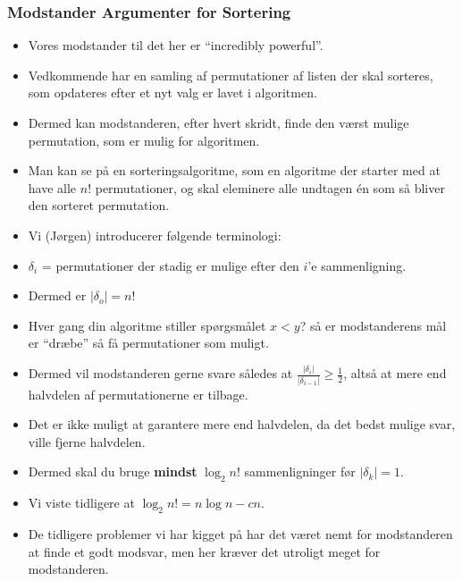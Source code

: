 \begin{frame}[allowframebreaks]
  \frametitle{Modstander Argumenter for Sortering}
\begin{itemize}
  \item Vores modstander til det her er ``incredibly powerful''.
  \item Vedkommende har en samling af permutationer af listen der skal sorteres, som opdateres efter et nyt valg er lavet i algoritmen.
  \item Dermed kan modstanderen, efter hvert skridt, finde den værst mulige permutation, som er mulig for algoritmen.
  \item Man kan se på en sorteringsalgoritme, som en algoritme der starter med at have alle $n!$ permutationer, og skal eleminere alle undtagen én som så bliver den sorteret permutation.
  \item Vi (Jørgen) introducerer følgende terminologi:
  \item \(\delta_{i}\) = permutationer der stadig er mulige efter den $i$'e sammenligning.
  \item Dermed er \(|\delta_{o}| = n!\)
  \item Hver gang din algoritme stiller spørgsmålet $x < y$? så er modstanderens mål er ``dræbe'' så få permutationer som muligt.
  \item Dermed vil modstanderen gerne svare således at $\frac{|\delta_{i}|}{|\delta_{i-1}|} \ge \frac{1}{2}$, altså at mere end halvdelen af permutationerne er tilbage.
  \item Det er ikke muligt at garantere mere end halvdelen, da det bedst mulige svar, ville fjerne halvdelen.
  \item Dermed skal du bruge \textbf{mindst} $\log_{2}n!$ sammenligninger før $|\delta_{k}|=1$.
  \item Vi viste tidligere at $\log_{2}n! = n \log n - cn$.
  \item De tidligere problemer vi har kigget på har det været nemt for modstanderen at finde et godt modsvar, men her kræver det utroligt meget for modstanderen.
\end{itemize}
\end{frame}

